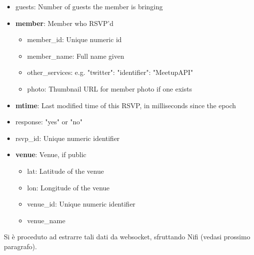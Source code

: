 \documentclass[fleqn,10pt]{SelfArx} %
\begin{document}
{\begin{itemize}[noitemsep]
\item guests: Number of guests the member is bringing
\item \textbf{member}: Member who RSVP'd
	\begin{itemize}[noitemsep]
    \item member\_id: Unique numeric id
    \item member\_name: Full name given
    \item other\_services: e.g. {"twitter": {"identifier": "MeetupAPI"}}
    \item photo: Thumbnail URL for member photo if one exists
	\end{itemize}
\item \textbf{mtime}: Last modified time of this RSVP, in milliseconds since the epoch
\item response: "yes" or "no"
\item rsvp\_id: Unique numeric identifier
\item \textbf{venue}: Venue, if public
	\begin{itemize}[noitemsep]
    \item lat: Latitude of the venue
    \item lon: Longitude of the venue
    \item venue\_id: Unique numeric identifier
    \item venue\_name
	\end{itemize}    
\end{itemize}
Si è proceduto ad estrarre tali dati da websocket, sfruttando Nifi (vedasi prossimo paragrafo).
}
\end{document}
